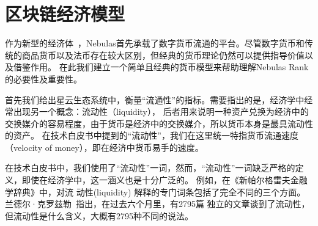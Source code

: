 \section{区块链经济模型}

\begin{comment}
区块链之上的加密数字货币无疑正在成为一种新的经济体~\cite{neweco}，这一经济体将包含越来越多的行为及个体，整个系统也逐渐变得更加复杂，由最初的、单纯的数字货币系统，正在逐步成为智能合约、甚至应用的基础平台。

尽管区块链之上的加密数字货币是一种新型的经济体，我们认为，其仍然遵循必然的经济规律。也就是说，数字货币对应的经济体的变化仍然遵循经济学中的客观规律，
使用传统的、严谨的经济学方法对加密数字货币进行研究依然是有效的。

我们希望Nebulas能够成为一个高效的经济体，既，Nebulas能够被大家使用，用于各种场景下的交易、并支撑各种智能合约及应用。
因此，我们需要深入的理解一个经济体是如何变得高效的，以及如何定量的描述这些指标。

在传统的经济学中，存在很多指标用于描述经济系统，例如``流动性''，``流通性''，``货币流动性''等。
我们认为使用``货币流通速度''是一个便于使用的指标，Selden~\cite{selden}指出，货币流通速度是一个时期中货币的流量与该时期
中货币平均存量的比率。也就是说xxxx。
\subsection{宏观模型}

\end{comment}



作为新型的经济体~\cite{neweco}，Nebulas首先承载了数字货币流通的平台。尽管数字货币和传统的商品货币以及法币存在较大区别，但经典的货币理论仍然可以提供指导价值以及借鉴作用。
在此我们建立一个简单且经典的货币模型来帮助理解Nebulas Rank的必要性及重要性。

首先我们给出星云生态系统中，衡量“流通性”的指标。需要指出的是，经济学中经常出现另一个概念：流动性（liquidity），
后者用来说明一种资产兑换为经济中的交换媒介的容易程度，由于货币是经济中的交换媒介，所以货币本身是最具流动性的资产。
在技术白皮书中提到的“流动性”，我们在这里统一特指货币流通速度（velocity of money），即在经济中货币易手的速度。

{\color{gray} 在技术白皮书中，我们使用了``流动性''一词，然而，``流动性''一词缺乏严格的定义，即使在经济学中，这一涵义也是十分广泛的。
例如，在《新帕尔格雷夫金融学辞典》中，对流
动性(liquidity) 解释的专门词条包括了完全不同的三个方面。兰德尔·克罗兹勒~\cite{randall}指出，在过去六个月里，有2795篇
独立的文章谈到了流动性，但流动性是什么含义，大概有2795种不同的说法。}


